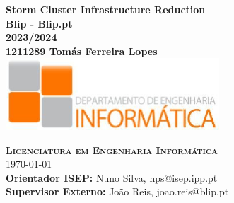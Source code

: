 \begin{center}

    \center

    {\huge \bfseries Storm Cluster Infrastructure Reduction}\\[.5cm]

    {\bfseries Blip - Blip.pt }\\[1cm]

    {\Large \bfseries 2023/2024}\\[2cm]

    {\Large\bf 1211289 Tomás Ferreira Lopes }\\[2.5cm]


    \includegraphics[width=8cm, keepaspectratio]{media/isep/dei.png}

    \vfill

    \textsc{
        \Large \bfseries Licenciatura em Engenharia Informática
    }
    \HRuleFront
    \\[.5cm]

    {\Large \monthyeardate\today}\\[1cm]

    {{\small\bf Orientador ISEP:  } {\small Nuno Silva, nps@isep.ipp.pt}} \\[4pt]
    {{\small\bf Supervisor Externo:} {\small João Reis, joao.reis@blip.pt}} \\[4pt]

\end{center}
